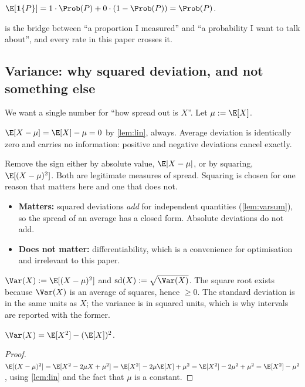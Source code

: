 \begin{corollary}
\label{cor:indexp}
$\E[\mathbf{1}\{P\}] = 1\cdot\Prob(P) + 0\cdot(1-\Prob(P)) = \Prob(P)$.
\end{corollary}

 is the bridge between ``a proportion I measured'' and ``a
probability I want to talk about'', and every rate in this paper crosses it.

\subsection{Variance: why squared deviation, and not something else}

We want a single number for ``how spread out is $X$''. Let $\mu := \E[X]$.

$\E[X-\mu] = \E[X]-\mu = 0$ by \cref{lem:lin}, always. Average deviation is
identically zero and carries no information: positive and negative deviations
cancel exactly.

Remove the sign either by absolute value, $\E|X-\mu|$, or by squaring,
$\E[(X-\mu)^2]$. Both are legitimate measures of spread. Squaring is chosen for
one reason that matters here and one that does not.

\begin{itemize}
\item \textbf{Matters:} squared deviations \emph{add} for independent quantities
      (\cref{lem:varsum}), so the spread of an average has a closed form. Absolute
      deviations do not add.
\item \textbf{Does not matter:} differentiability, which is a convenience for
      optimisation and irrelevant to this paper.
\end{itemize}

\begin{definition}
$\Var(X) := \E[(X-\mu)^2]$ and $\operatorname{sd}(X) := \sqrt{\Var(X)}$. The
square root exists because $\Var(X)$ is an average of squares, hence
$\ge 0$. The standard deviation is in the same units as $X$; the variance is in
squared units, which is why intervals are reported with the former.
\end{definition}

\begin{lemma}
\label{lem:varalt}
$\Var(X) = \E[X^2] - (\E[X])^2$.
\end{lemma}
\begin{proof}
$\E[(X-\mu)^2] = \E[X^2 - 2\mu X + \mu^2]
 = \E[X^2] - 2\mu\E[X] + \mu^2 = \E[X^2] - 2\mu^2 + \mu^2 = \E[X^2]-\mu^2$,
using \cref{lem:lin} and the fact that $\mu$ is a constant.
\end{proof}

